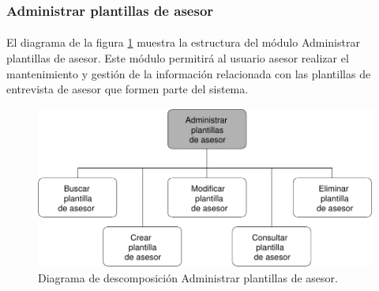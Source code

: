 \subsubsection{Administrar plantillas de asesor}

  \paragraph{}El diagrama de la figura
  \ref{diagramaDescomposicionAdministrarPlantillasAsesor} muestra la
  estructura del módulo Administrar plantillas de asesor. Este módulo permitirá
  al usuario asesor realizar el mantenimiento y gestión de la información
  relacionada con las plantillas de entrevista de asesor que formen parte del
  sistema.

  \begin{figure}[!ht]
    \begin{center}
      \includegraphics[]{11.Disenyo_Arquitectonico/11.2.Diagramas_Descomposicion/11.2.4.Modulo_asesores/AdministrarBBDD/AdministrarPlantillasAsesor/Diagramas/administrar_plantillas_asesor.pdf}
      \caption{Diagrama de descomposición Administrar plantillas de asesor.}
      \label{diagramaDescomposicionAdministrarPlantillasAsesor}
    \end{center}
  \end{figure}
